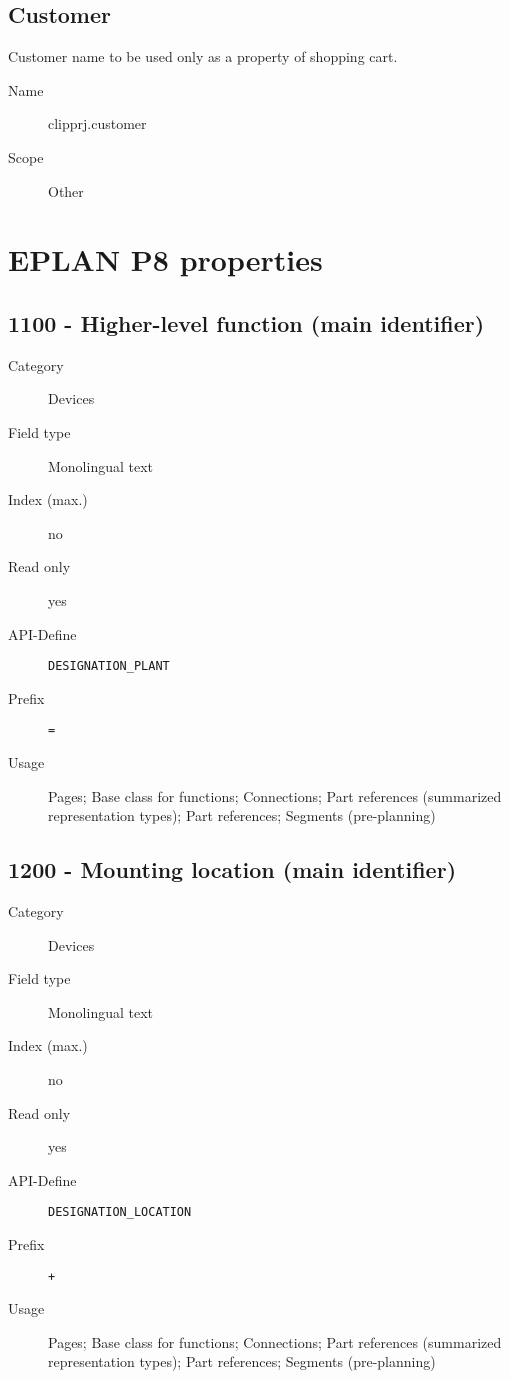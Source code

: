 \documentclass[%
	a4paper,
	oneside,
	listof=numbered,
	parskip=half,
	headsepline=true,
	footsepline=false,
	normalheadings,
	0.7headlines,
	headexclude,
	]{scrbook}
\begin{document}
\subsection{Customer}

Customer name to be used only as a property of shopping cart.

\begin{description}
	\item[Name] clipprj.customer
	\item[Scope] Other
\end{description}

\section{EPLAN P8 properties}
\label{sec:p8_properties}

\subsection{1100 - Higher-level function (main identifier)}

\begin{description}
	\item[Category] Devices
	\item[Field type] Monolingual text
	\item[Index (max.)] no
	\item[Read only] yes
	\item[API-Define] \verb|DESIGNATION_PLANT|
	\item[Prefix] \verb|=|
	\item[Usage] Pages; Base class for functions; Connections; Part references (summarized representation types); Part references; Segments (pre-planning)
\end{description}

\subsection{1200 - Mounting location (main identifier)}

\begin{description}
	\item[Category] Devices
	\item[Field type] Monolingual text
	\item[Index (max.)] no
	\item[Read only] yes
	\item[API-Define] \verb|DESIGNATION_LOCATION|
	\item[Prefix] \verb|+|
	\item[Usage] Pages; Base class for functions; Connections; Part references (summarized representation types); Part references; Segments (pre-planning)
\end{description}
\end{document}
